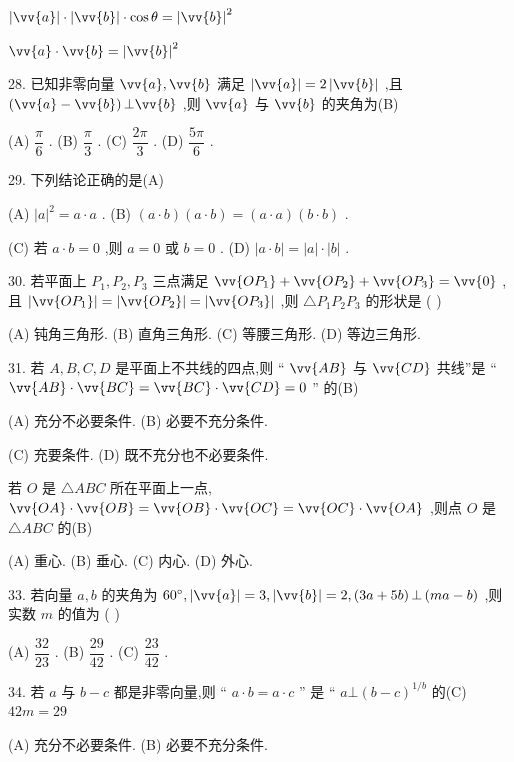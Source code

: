 $\left| \vv{a}\right|  \cdot  \left| \vv{b}\right|  \cdot  \cos \theta  = {\left| \vv{b}\right| }^{2}$

$\vv{a} \cdot  \vv{b} = {\left| \vv{b}\right| }^{2}$

28. 已知非零向量 $\vv{a},\vv{b}$ 满足 $\left| \vv{a}\right|  = 2\left| \vv{b}\right|$ ,且 $\left( {\vv{a} - \vv{b}}\right) \bot \vv{b}$ ,则 $\vv{a}$ 与 $\vv{b}$ 的夹角为(B)

(A) $\dfrac{\pi }{6}$ . (B) $\dfrac{\pi }{3}$ . (C) $\dfrac{2\pi }{3}$ . (D) $\dfrac{5\pi }{6}$ .

29. 下列结论正确的是(A)

(A) ${\left| a\right| }^{2} = a \cdot  a$ . (B) $\left( {a \cdot  b}\right) \left( {a \cdot  b}\right)  = \left( {a \cdot  a}\right) \left( {b \cdot  b}\right)$ .

(C) 若 $a \cdot  b = 0$ ,则 $a = 0$ 或 $b = 0$ . (D) $\left| {a \cdot  b}\right|  = \left| a\right|  \cdot  \left| b\right|$ .

30. 若平面上 ${P}_{1},{P}_{2},{P}_{3}$ 三点满足 $\vv{O{P}_{1}} + \vv{O{P}_{2}} + \vv{O{P}_{3}} = \vv{0}$ ,且 $\left| \vv{O{P}_{1}}\right|  = \left| \vv{O{P}_{2}}\right|  = \left| \vv{O{P}_{3}}\right|$ ,则 $\bigtriangleup {P}_{1}{P}_{2}{P}_{3}$ 的形状是 (   )

(A) 钝角三角形. (B) 直角三角形. (C) 等腰三角形. (D) 等边三角形.

31. 若 $A,B,C,D$ 是平面上不共线的四点,则 “ $\vv{AB}$ 与 $\vv{CD}$ 共线”是 “ $\vv{AB} \cdot  \vv{BC} = \vv{BC} \cdot  \vv{CD} = 0$ ” 的(B)

(A) 充分不必要条件. (B) 必要不充分条件.

(C) 充要条件. (D) 既不充分也不必要条件.

若 $O$ 是 $\bigtriangleup {ABC}$ 所在平面上一点, $\vv{OA} \cdot  \vv{OB} = \vv{OB} \cdot  \vv{OC} = \vv{OC} \cdot  \vv{OA}$ ,则点 $O$ 是 $\bigtriangleup {ABC}$ 的(B)

(A) 重心. (B) 垂心. (C) 内心. (D) 外心.

33. 若向量 $a,b$ 的夹角为 ${60}^{ \circ  },\left| \vv{a}\right|  = 3,\left| \vv{b}\right|  = 2,\left( {{3a} + {5b}}\right)  \bot  \left( {{ma} - b}\right)$ ,则实数 $m$ 的值为 (   )

(A) $\dfrac{32}{23}$ . (B) $\dfrac{29}{42}$ . (C) $\dfrac{23}{42}$ .

34. 若 $a$ 与 $b - c$ 都是非零向量,则 “ $a \cdot  b = a \cdot  c$ ” 是 “ $a \bot  {\left( b - c\right) }^{1/b}$ 的(C) ${42m} = {29}$

(A) 充分不必要条件. (B) 必要不充分条件.

